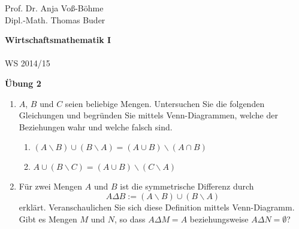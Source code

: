 \documentclass[12pt,a4paper]{scrreprt}
\begin{document}
 
\begin{flushleft}
Prof. Dr.  Anja Voß-Böhme \\
Dipl.-Math. Thomas Buder
\end{flushleft}

\begin{center}{\large\bf Wirtschaftsmathematik I} \\ \\ WS 2014/15 \end{center}

\begin{center}{\large\bf Übung 2 } 
\end{center}


\bigskip
\begin{enumerate}
 			
		 \item $A$, $B$ und $C$ seien beliebige Mengen. Untersuchen Sie die folgenden 							Gleichungen und begründen Sie mittels Venn-Diagrammen, welche der 									Beziehungen wahr und welche falsch sind.
		 				\begin{enumerate}
		 				\item $(A \backslash B) \cup (B \backslash A) = (A \cup B) \backslash (A                    \cap B)$
						\item $A \cup (B \backslash C) = (A \cup B) \backslash (C \backslash A)$
					\end{enumerate}
								\item Für zwei Mengen $A$ und $B$ ist die symmetrische Differenz     
								durch
						\[A \Delta B := (A \backslash B) \cup (B \backslash A)\]
						erklärt. Veranschaulichen Sie sich diese Definition mittels 
						Venn-Diagramm. 
						Gibt es Mengen $M$ und $N$, so dass $A\Delta M = A$ 
						beziehungsweise $A \Delta N = \emptyset$?		
					

\end{enumerate}
\end{document}
